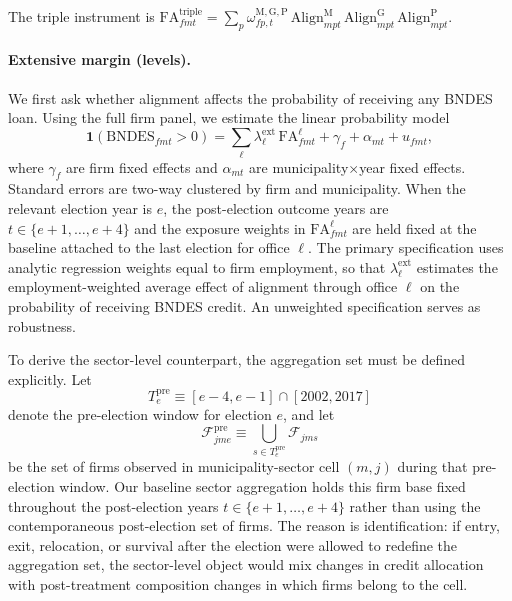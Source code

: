 \documentclass{article}
\newcommand{\Align}{\mathrm{Align}}
\newcommand{\FA}{\mathrm{FA}}
\begin{document}
The triple instrument is
$\FA^{\mathrm{triple}}_{fmt}
= \sum_p \omega^{\mathrm{M,G,P}}_{fp,t}\,\Align^{\mathrm{M}}_{mpt}\,\Align^{\mathrm{G}}_{mpt}\,\Align^{\mathrm{P}}_{mpt}$.

\paragraph{Extensive margin (levels).}
We first ask whether alignment affects the probability of receiving any BNDES loan.
Using the full firm panel, we estimate the linear probability model
\[
  \mathbf{1}(\text{BNDES}_{fmt} > 0) = \sum_{\ell} \lambda^{\text{ext}}_{\ell}\, \FA^{\ell}_{fmt}
  + \gamma_{f} + \alpha_{mt} + u_{fmt},
\]
where $\gamma_f$ are firm fixed effects
and $\alpha_{mt}$ are municipality$\times$year fixed effects.
Standard errors are two-way clustered by firm and municipality.
When the relevant election year is $e$, the post-election outcome years are
$t \in \{e+1,\dots,e+4\}$ and the exposure weights in $\FA^\ell_{fmt}$ are held fixed
at the baseline attached to the last election for office $\ell$.
The primary specification uses analytic regression weights equal to firm employment, 
so that $\lambda^{\text{ext}}_\ell$ estimates the
employment-weighted average effect of alignment through office $\ell$
on the probability of receiving BNDES credit.
An unweighted specification serves as robustness.

To derive the sector-level counterpart, the aggregation set must be
defined explicitly. Let
\[
  T_e^{\mathrm{pre}} \equiv [e-4,e-1] \cap [2002,2017]
\]
denote the pre-election window for election $e$, and let
\[
  \mathcal{F}^{\mathrm{pre}}_{jme}
  \equiv
  \bigcup_{s \in T_e^{\mathrm{pre}}} \mathcal{F}_{jms}
\]
be the set of firms observed in municipality-sector cell $(m,j)$ during that
pre-election window. Our baseline sector aggregation holds this firm base fixed
throughout the post-election years $t \in \{e+1,\dots,e+4\}$ rather than using
the contemporaneous post-election set of firms. The reason is identification:
if entry, exit, relocation, or survival after the election were allowed to
redefine the aggregation set, the sector-level object would mix changes in
credit allocation with post-treatment composition changes in which firms belong
to the cell.
\end{document}
